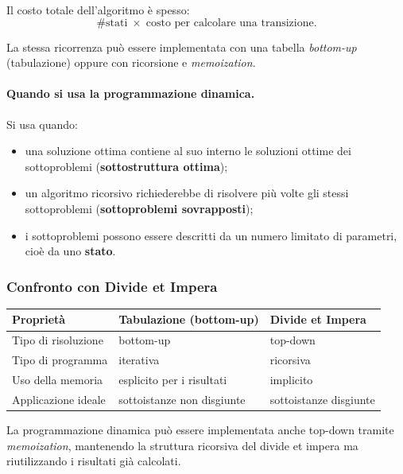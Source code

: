 Il costo totale dell'algoritmo è spesso:
\[
\#\text{stati} \;\times\; \text{costo per calcolare una transizione.}
\]

La stessa ricorrenza può essere implementata con una tabella \emph{bottom-up}
(tabulazione) oppure con ricorsione e \emph{memoization}.

\begin{nota}
\paragraph{Quando si usa la programmazione dinamica.}
Si usa quando:
\begin{itemize}
	\item una soluzione ottima contiene al suo interno le soluzioni ottime dei
	sottoproblemi (\textbf{sottostruttura ottima});
	\item un algoritmo ricorsivo richiederebbe di risolvere più volte gli stessi
	sottoproblemi (\textbf{sottoproblemi sovrapposti});
	\item i sottoproblemi possono essere descritti da un numero limitato di parametri,
	cioè da uno \textbf{stato}.
\end{itemize}
\end{nota}

\subsubsection{Confronto con Divide et Impera}

\begin{center}
\begin{tabular}{lll}
	\toprule
	\textbf{Proprietà} & \textbf{Tabulazione (bottom-up)} & \textbf{Divide et Impera} \\
	\midrule
	Tipo di risoluzione   & bottom-up   & top-down \\
	Tipo di programma     & iterativa   & ricorsiva \\
	Uso della memoria     & esplicito per i risultati & implicito \\
	Applicazione ideale   & sottoistanze non disgiunte & sottoistanze disgiunte \\
	\bottomrule
\end{tabular}
\end{center}

\begin{nota}
La programmazione dinamica può essere implementata anche top-down tramite
\emph{memoization}, mantenendo la struttura ricorsiva del divide et impera ma
riutilizzando i risultati già calcolati.
\end{nota}

